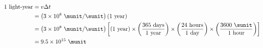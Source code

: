 \begin{align*}
     1\ \text{light-year}     &=  v \Delta t  \\
             &= \left(3\times10^8\ \munit/\sunit\right)(1\ \text{year}) \\
             &= \left(3\times10^8\ \munit/\sunit\right)\left[(1\ \text{year}) 
                  \times \left(\frac{365\ \text{days}}{1\ \text{year}}\right) \times \left(\frac{24\ \text{hours}}{1\ \text{day}}\right)
                   \times \left(\frac{3600\ \sunit}{1\ \text{hour}}\right)\right] \\
             &= 9.5\times10^{15}\ \munit
\end{align*}



